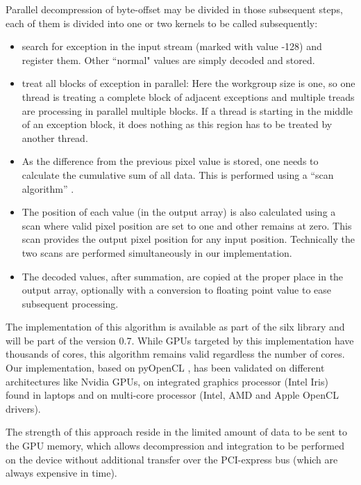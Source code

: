 \documentclass[preprint, pdf]{iucr}              %
\begin{document}
Parallel decompression of byte-offset may be divided in those subsequent steps,
each of them is divided into one or two kernels to be called subsequently:
\begin{itemize}
  \item search for exception in the input stream (marked with value -128) and
  register them. Other ``normal" values are simply decoded and stored.
  \item treat all blocks of exception in parallel: Here the workgroup size is
  one, so one thread is treating a complete block of adjacent exceptions and
  multiple treads are processing in parallel multiple blocks. If a thread is
  starting in the middle of an exception block, it does nothing as this region
  has to be treated by another thread.
  \item As the difference from the previous pixel value is stored, one needs to
  calculate the cumulative sum of all data. This is performed using a ``scan
  algorithm'' \cite{scan}.
  \item The position of each value (in the output array) is also calculated
  using a scan where valid pixel position are set to one and other remains at
  zero. This scan provides the output pixel position for any input position.
  Technically the two scans are performed simultaneously in our implementation.
  \item The decoded values, after summation, are copied at the proper place in
  the output array, optionally with a conversion to floating point value to
  ease subsequent processing.
\end{itemize} 

The implementation of this algorithm is available as part of the silx
\cite{silx} library and will be part of the version 0.7.
While GPUs targeted by this implementation have thousands of
cores, this algorithm remains valid regardless the
number of cores.
Our implementation, based on pyOpenCL \cite{pyopencl}, 
has been validated on different architectures like Nvidia GPUs, on 
integrated graphics processor (Intel Iris) found in laptops and on multi-core
processor (Intel, AMD and Apple OpenCL drivers). 

The strength of this approach reside in the limited amount of
data to be sent to the GPU memory, which allows decompression and
integration to be performed on the device without additional
transfer over the PCI-express bus (which are always expensive in time).
\end{document}

